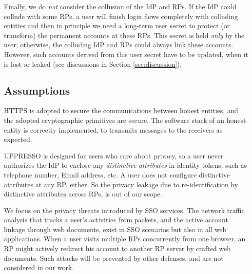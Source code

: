 
Finally, we do \emph{not} consider the collusion of the IdP and RPs.
    If the IdP could collude with some RPs,
        a user will finish login flows completely with colluding entities
        and then in principle we need a long-term user secret to protect (or transform) the permanent accounts at these RPs.
This secret is held \emph{only} by the user;
    otherwise, the colluding IdP and RPs could always link these accounts.
However, such accounts derived from this user secret have to be updated,
    when it is lost or leaked
    (see discussions in Section \ref{sec:discussion}).

\subsection{Assumptions}
HTTPS is adopted to secure the communications between honest entities,
 and the adopted cryptographic primitives are secure.
The software stack of an honest entity is correctly implemented,
     to transmits messages to the receivers as expected.

UPPRESSO is designed for users who care about privacy,
so a user never authorizes the IdP to enclose any \emph{distinctive attributes} in identity tokens,
 such as telephone number, Email address, etc.
A user does not configure  distinctive attributes at any RP, either.
So the privacy leakage due to re-identification by distinctive attributes across RPs,
    is out of our scope.

We focus on the privacy threats introduced by SSO services.
The network traffic analysis that tracks a user's activities from packets,
    and the active account linkage through web documents,
        exist in SSO scenarios but also in all web applications.
When a user visits multiple RPs concurrently from one browser,
        an RP might actively redirect his account to another RP server by crafted web documents.
Such attacks will be prevented by other defenses,
    and are not considered in our work.

